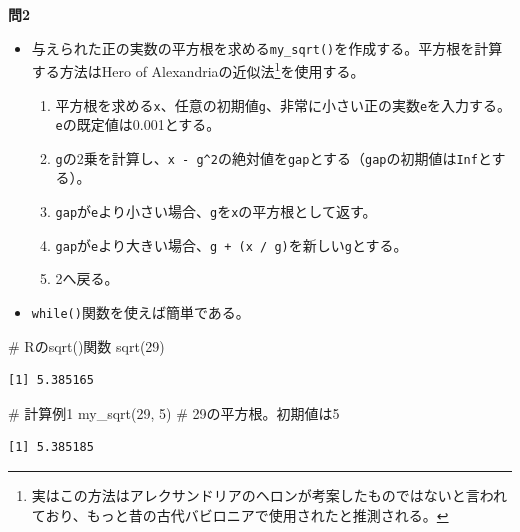 \documentclass[
  a4paper,
  pandoc,
  ja=standard,
  jafont=haranoaji]{bxjsbook}
\newenvironment{Shaded}{\begin{snugshade}}{\end{snugshade}}
\newcommand{\CommentTok}[1]{\textcolor[rgb]{0.37,0.37,0.37}{#1}}
\newcommand{\DecValTok}[1]{\textcolor[rgb]{0.68,0.00,0.00}{#1}}
\newcommand{\FunctionTok}[1]{\textcolor[rgb]{0.28,0.35,0.67}{#1}}
\newcommand{\NormalTok}[1]{\textcolor[rgb]{0.00,0.48,0.65}{#1}}
\providecommand{\tightlist}{%
  \setlength{\itemsep}{0pt}\setlength{\parskip}{0pt}}
\begin{document}
\textbf{問2}

\begin{itemize}
\tightlist
\item
  与えられた正の実数の平方根を求める\texttt{my\_sqrt()}を作成する。平方根を計算する方法はHero
  of Alexandriaの近似法\footnote{実はこの方法はアレクサンドリアのヘロンが考案したものではないと言われており、もっと昔の古代バビロニアで使用されたと推測される。}を使用する。

  \begin{enumerate}
  \def\labelenumi{\arabic{enumi}.}
  \tightlist
  \item
    平方根を求める\texttt{x}、任意の初期値\texttt{g}、非常に小さい正の実数\texttt{e}を入力する。\texttt{e}の既定値は0.001とする。
  \item
    \texttt{g}の2乗を計算し、\texttt{x\ -\ g\^{}2}の絶対値を\texttt{gap}とする（\texttt{gap}の初期値は\texttt{Inf}とする）。
  \item
    \texttt{gap}が\texttt{e}より小さい場合、\texttt{g}を\texttt{x}の平方根として返す。
  \item
    \texttt{gap}が\texttt{e}より大きい場合、\texttt{g\ +\ (x\ /\ g)}を新しい\texttt{g}とする。
  \item
    2へ戻る。
  \end{enumerate}
\item
  \texttt{while()}関数を使えば簡単である。
\end{itemize}

\begin{Shaded}
\begin{Highlighting}[numbers=left,,]
\CommentTok{\# Rのsqrt()関数}
\FunctionTok{sqrt}\NormalTok{(}\DecValTok{29}\NormalTok{)}
\end{Highlighting}
\end{Shaded}

\begin{verbatim}
[1] 5.385165
\end{verbatim}

\begin{Shaded}
\begin{Highlighting}[numbers=left,,]
\CommentTok{\# 計算例1}
\FunctionTok{my\_sqrt}\NormalTok{(}\DecValTok{29}\NormalTok{, }\DecValTok{5}\NormalTok{) }\CommentTok{\# 29の平方根。初期値は5}
\end{Highlighting}
\end{Shaded}

\begin{verbatim}
[1] 5.385185
\end{verbatim}
\end{document}
